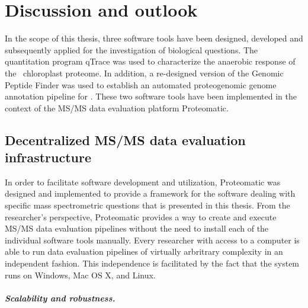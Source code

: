 \cleardoublepage
{}
\chapter{Discussion and outlook}

In the scope of this thesis, three software tools have been designed, 
developed and subsequently applied for the investigation of biological 
questions.
The quantitation program qTrace was used to characterize the anaerobic 
response of the \cre~chloroplast proteome.
In addition, a re-designed version of the Genomic Peptide Finder was used
to establish an automated proteogenomic genome annotation pipeline for \cre.
These two software tools have been implemented in the context of the MS/MS data 
evaluation platform Proteomatic.

\section{Decentralized MS/MS data evaluation infrastructure}

In order to facilitate software development and utilization, Proteomatic
was designed and implemented to provide a framework for the software
dealing with specific mass spectrometric questions that is presented in 
this thesis.
From the researcher's perspective, Proteomatic provides a way to create and
execute MS/MS data evaluation pipelines without the need to install each of
the individual software tools manually.
Every researcher with access to a computer is able to run data evaluation
pipelines of virtually arbritrary complexity in an independent fashion.
This independence is facilitated by the fact that the system runs on Windows,
Mac OS X, and Linux.

\paragraph{Scalability and robustness.}

